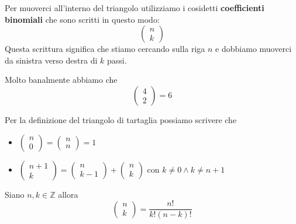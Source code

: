 Per muoverci all'interno del triangolo utilizziamo i cosidetti \textbf{coefficienti binomiali}
che sono scritti in questo modo:
\begin{equation*}
	\begin{pmatrix}
		n \\ k
	\end{pmatrix}
\end{equation*}
Questa scrittura significa che stiamo cercando sulla riga $n$ e dobbiamo muoverci da sinistra
verso destra di $k$ passi.

\begin{example}
	Molto banalmente abbiamo che
	\begin{equation*}
		\begin{pmatrix}
			4 \\ 2
		\end{pmatrix} = 6
	\end{equation*}
\end{example}

Per la definizione del triangolo di tartaglia possiamo scrivere che
\begin{itemize}
	\item $
		      \begin{pmatrix}
			      n \\ 0
		      \end{pmatrix} =
		      \begin{pmatrix}
			      n \\ n
		      \end{pmatrix} = 1
	      $
	\item $
		      \begin{pmatrix}
			      n + 1 \\ k
		      \end{pmatrix} =
		      \begin{pmatrix}
			      n \\ k - 1
		      \end{pmatrix} +
		      \begin{pmatrix}
			      n \\ k
		      \end{pmatrix}
	      $ con $k \neq 0 \wedge k \neq n + 1$
\end{itemize}

\begin{proposition}
	Siano $n, k \in \mathbb{Z}$ allora
	\begin{equation*}
		\begin{pmatrix}
			n \\ k
		\end{pmatrix} =
		\frac{n!}{k! (n - k)!}
	\end{equation*}
\end{proposition}

